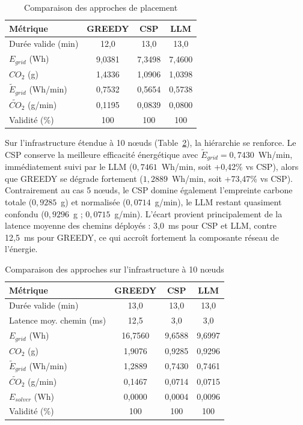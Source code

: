 ﻿\documentclass[systeme]{compas2026}
\begin{document}
\begin{table}[H]
    \centering
    \footnotesize
    \caption{Comparaison des approches de placement}
    \label{tab:results_main}
    \begin{tabular}{lccc}
        \toprule
        \textbf{Métrique} & \textbf{GREEDY} & \textbf{CSP} & \textbf{LLM} \\
        \midrule
        Durée valide (min)    & 12{,}0 & 13{,}0 & 13{,}0 \\
        $E_{grid}$ (Wh)       & 9{,}0381 & 7{,}3498 & 7{,}4600 \\
        $CO_2$ (g)            & 1{,}4336 & 1{,}0906 & 1{,}0398 \\
        $\widetilde{E}_{grid}$ (Wh/min) & 0{,}7532 & 0{,}5654 & 0{,}5738 \\
        $\widetilde{CO}_2$ (g/min)      & 0{,}1195 & 0{,}0839 & 0{,}0800 \\
        Validité (\%)         & 100 & 100 & 100 \\
        \bottomrule
    \end{tabular}
\end{table}

Sur l'infrastructure étendue à 10 nœuds (Table~\ref{tab:results_infra10}), la hiérarchie se renforce. Le CSP conserve la meilleure efficacité énergétique avec $\widetilde{E}_{grid}=0{,}7430$~Wh/min, immédiatement suivi par le LLM ($0{,}7461$~Wh/min, soit +0{,}42\% vs CSP), alors que GREEDY se dégrade fortement ($1{,}2889$~Wh/min, soit +73{,}47\% vs CSP). Contrairement au cas 5 nœuds, le CSP domine également l'empreinte carbone totale ($0{,}9285$~g) et normalisée ($0{,}0714$~g/min), le LLM restant quasiment confondu ($0{,}9296$~g ; $0{,}0715$~g/min). L'écart provient principalement de la latence moyenne des chemins déployés : 3{,}0~ms pour CSP et LLM, contre 12{,}5~ms pour GREEDY, ce qui accroît fortement la composante réseau de l'énergie.

\begin{table}[H]
    \centering
    \footnotesize
    \caption{Comparaison des approches sur l'infrastructure à 10 nœuds}
    \label{tab:results_infra10}
    \begin{tabular}{lccc}
        \toprule
        \textbf{Métrique} & \textbf{GREEDY} & \textbf{CSP} & \textbf{LLM} \\
        \midrule
        Durée valide (min) & 13{,}0 & 13{,}0 & 13{,}0 \\
        Latence moy. chemin (ms) & 12{,}5 & 3{,}0 & 3{,}0 \\
        $E_{grid}$ (Wh) & 16{,}7560 & 9{,}6588 & 9{,}6997 \\
        $CO_2$ (g) & 1{,}9076 & 0{,}9285 & 0{,}9296 \\
        $\widetilde{E}_{grid}$ (Wh/min) & 1{,}2889 & 0{,}7430 & 0{,}7461 \\
        $\widetilde{CO}_2$ (g/min) & 0{,}1467 & 0{,}0714 & 0{,}0715 \\
        $E_{solver}$ (Wh) & 0{,}0000 & 0{,}0004 & 0{,}0096 \\
        Validité (\%) & 100 & 100 & 100 \\
        \bottomrule
    \end{tabular}
\end{table}
\end{document}
